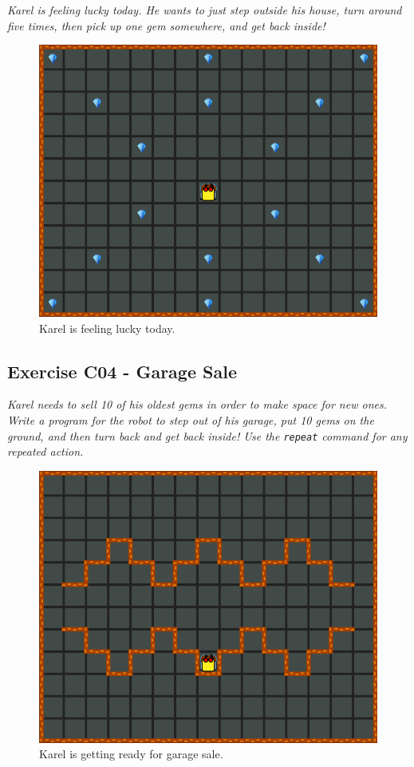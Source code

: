 \documentclass[article,A4,12pt]{llncs}
\begin{document}
{{{{{\em Karel is feeling lucky today. He wants to just step outside his house, 
turn around five times, then pick up one gem somewhere, and get back inside!}


\begin{figure}[!ht]
\begin{center}
\includegraphics[height=0.4\textwidth]{img/c03.png}
\end{center}
\vspace{-4mm}
\caption{Karel is feeling lucky today.}
\label{fig:c03}
\vspace{-4mm}
\end{figure}
\noindent


\subsection{Exercise C04 - Garage Sale}

{\em Karel needs to sell 10 of his oldest gems in order to make space for new ones. 
Write a program for the robot to step out of his garage, put 10 gems on the ground, 
and then turn back and get back inside! Use the {\tt repeat} command for any repeated 
action.}


\begin{figure}[!ht]
\begin{center}
\includegraphics[height=0.4\textwidth]{img/c04.png}
\end{center}
\vspace{-4mm}
\caption{Karel is getting ready for garage sale.}
\label{fig:c04}
\vspace{-10mm}
\end{figure}
\noindent

}}}}
\end{document}
